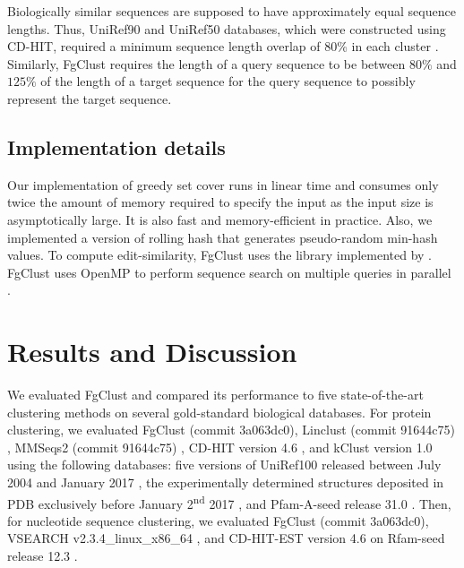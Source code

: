 \documentclass[11pt,letterpaper]{article}
\begin{document}
Biologically similar sequences are supposed to have approximately equal sequence lengths.
Thus, UniRef90 and UniRef50 databases, which were constructed using CD-HIT, required a minimum sequence length overlap of 80\% in each cluster \citep{suzek2014uniref}.
Similarly, FgClust requires the length of a query sequence to be between \(80\%\) and \(125\%\) of the length of a target sequence for the query sequence to possibly represent the target sequence. 

\subsection{Implementation details}

Our implementation of greedy set cover runs in linear time and consumes only twice the amount of memory required to specify the input as the input size is asymptotically large. It is also fast and memory-efficient in practice. Also, we implemented a version of rolling hash that generates pseudo-random min-hash values.
To compute edit-similarity, FgClust uses the library implemented by \citet{vsovsic2017edlib}.
FgClust uses OpenMP to perform sequence search on multiple queries in parallel \citep{dagum1998openmp}.


\section{Results and Discussion}

We evaluated FgClust and compared its performance to five state-of-the-art clustering methods on several gold-standard biological databases.
For protein clustering,
we evaluated FgClust (commit 3a063dc0),
Linclust (commit 91644c75) \citep{steinegger2017linclust}, 
MMSeqs2 (commit 91644c75) \citep{steinegger2017mmseqs2}, 
CD-HIT version 4.6 \citep{fu2012cd},
and kClust version 1.0 \citep{hauser2013kclust} using the following databases:
five versions of UniRef100 released between July 2004 and January 2017 \citep{suzek2014uniref},
the experimentally determined structures deposited in PDB exclusively before January 2\textsuperscript{nd} 2017 \citep{berman2006protein},
and Pfam-A-seed release 31.0 \cite{finn2016pfam}.
Then, for nucleotide sequence clustering, we evaluated FgClust
(commit 3a063dc0), %
VSEARCH v2.3.4\_linux\_x86\_64 \citep{rognes2016vsearch}, and CD-HIT-EST version 4.6 \citep{fu2012cd} on Rfam-seed release 12.3 \citep{nawrocki2014rfam}.
\end{document}
